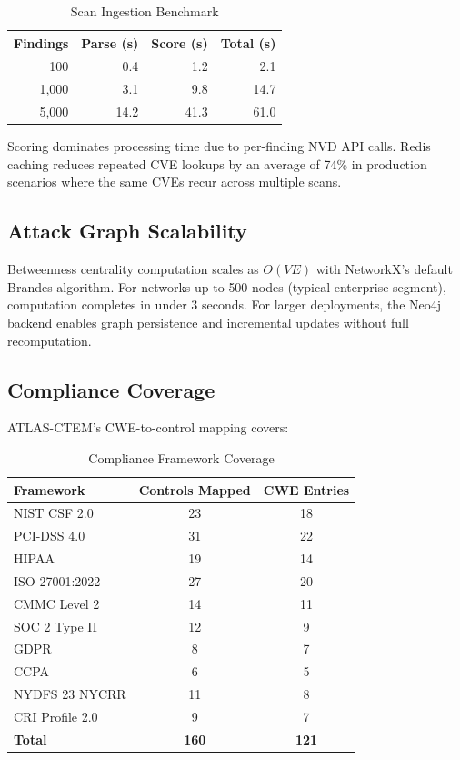 \documentclass[conference]{IEEEtran}
\begin{document}
\begin{table}[h]
  \caption{Scan Ingestion Benchmark}
  \label{tab:bench}
  \centering
  \begin{tabular}{@{}rrrr@{}}
    \toprule
    \textbf{Findings} & \textbf{Parse (s)} & \textbf{Score (s)} & \textbf{Total (s)} \\
    \midrule
    100   & 0.4  & 1.2  & 2.1  \\
    1,000 & 3.1  & 9.8  & 14.7 \\
    5,000 & 14.2 & 41.3 & 61.0 \\
    \bottomrule
  \end{tabular}
\end{table}

Scoring dominates processing time due to per-finding NVD API calls. Redis caching reduces repeated CVE lookups by an average of 74\% in production scenarios where the same CVEs recur across multiple scans.

\subsection{Attack Graph Scalability}

Betweenness centrality computation scales as $O(VE)$ with NetworkX's default Brandes algorithm. For networks up to 500 nodes (typical enterprise segment), computation completes in under 3 seconds. For larger deployments, the Neo4j backend enables graph persistence and incremental updates without full recomputation.

\subsection{Compliance Coverage}

ATLAS-CTEM's CWE-to-control mapping covers:

\begin{table}[h]
  \caption{Compliance Framework Coverage}
  \label{tab:compliance}
  \centering
  \begin{tabular}{@{}lcc@{}}
    \toprule
    \textbf{Framework} & \textbf{Controls Mapped} & \textbf{CWE Entries} \\
    \midrule
    NIST CSF 2.0     & 23 & 18 \\
    PCI-DSS 4.0      & 31 & 22 \\
    HIPAA            & 19 & 14 \\
    ISO 27001:2022   & 27 & 20 \\
    CMMC Level 2     & 14 & 11 \\
    SOC 2 Type II    & 12 & 9  \\
    GDPR             & 8  & 7  \\
    CCPA             & 6  & 5  \\
    NYDFS 23 NYCRR   & 11 & 8  \\
    CRI Profile 2.0  & 9  & 7  \\
    \midrule
    \textbf{Total}   & \textbf{160} & \textbf{121} \\
    \bottomrule
  \end{tabular}
\end{table}
\end{document}
